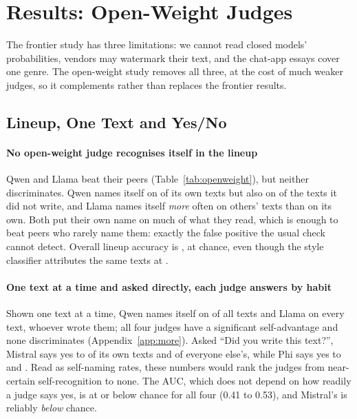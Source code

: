 \section{Results: Open-Weight Judges}
\label{sec:openweight}

The frontier study has three limitations: we cannot read closed models'
probabilities, vendors may watermark their text, and the chat-app essays cover
one genre. The open-weight study removes all three, at the cost of much weaker
judges, so it complements rather than replaces the frontier results.

\subsection{Lineup, One Text and Yes/No}



\paragraph{No open-weight judge recognises itself in the lineup} Qwen and
Llama beat their peers (Table~\ref{tab:openweight}), but neither
discriminates. Qwen names itself on \OWQwenLineupSelf{} of its own texts but
also on \OWQwenLineupFA{} of the texts it did not write, and Llama names itself
\emph{more} often on others' texts than on its own. Both put their own name on
much of what they read, which is enough to beat peers who rarely name them:
exactly the false positive the usual check cannot detect. Overall lineup
accuracy is \OWLineupAcc{}, at chance, even though the style classifier
attributes the same texts at \OWClfPooled{}.

\paragraph{One text at a time and asked directly, each judge answers by
habit} Shown one text at a time, Qwen names itself on \OWQwenSingleNamesSelf{}
of all texts and Llama on every text, whoever wrote them; all four judges have
a significant self-advantage and none discriminates (Appendix~\ref{app:more}).
Asked ``Did you write this text?'', Mistral says yes to \OWMistralBinaryHit{}
of its own texts and \OWMistralBinaryFA{} of everyone else's, while Phi says
yes to \OWPhiBinaryHit{} and \OWPhiBinaryFA{}. Read as self-naming rates, these
numbers would rank the judges from near-certain self-recognition to none. The
AUC, which does not depend on how readily a judge says yes, is at or below
chance for all four (0.41 to 0.53), and Mistral's is reliably \emph{below}
chance.

